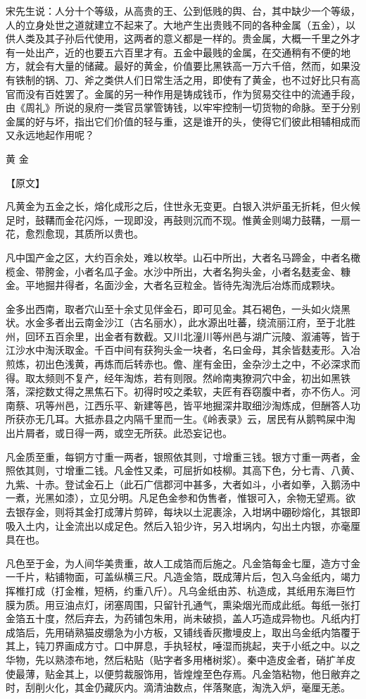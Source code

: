 \documentclass[12pt,UTF8]{ctexbook}
\begin{document}
宋先生说：人分十个等级，从高贵的王、公到低贱的舆、台，其中缺少一个等级，人的立身处世之道就建立不起来了。大地产生出贵贱不同的各种金属（五金），以供人类及其子孙后代使用，这两者的意义都是一样的。贵金属，大概一千里之外才有一处出产，近的也要五六百里才有。五金中最贱的金属，在交通稍有不便的地方，就会有大量的储藏。最好的黄金，价值要比黑铁高一万六千倍，然而，如果没有铁制的锅、刀、斧之类供人们日常生活之用，即使有了黄金，也不过好比只有高官而没有百姓罢了。金属的另一种作用是铸成钱币，作为贸易交往中的流通手段，由《周礼》所说的泉府一类官员掌管铸钱，以牢牢控制一切货物的命脉。至于分别金属的好与坏，指出它们价值的轻与重，这是谁开的头，使得它们彼此相辅相成而又永远地起作用呢？

黄 金

【原文】

凡黄金为五金之长，熔化成形之后，住世永无变更。白银入洪炉虽无折耗，但火候足时，鼓鞲而金花闪烁，一现即没，再鼓则沉而不现。惟黄金则竭力鼓鞲，一扇一花，愈烈愈现，其质所以贵也。

凡中国产金之区，大约百余处，难以枚举。山石中所出，大者名马蹄金，中者名橄榄金、带胯金，小者名瓜子金。水沙中所出，大者名狗头金，小者名麸麦金、糠金。平地掘井得者，名面沙金，大者名豆粒金。皆待先淘洗后冶炼而成颗块。

金多出西南，取者穴山至十余丈见伴金石，即可见金。其石褐色，一头如火烧黑状。水金多者出云南金沙江（古名丽水），此水源出吐蕃，绕流丽江府，至于北胜州，回环五百余里，出金者有数截。又川北潼川等州邑与湖广沅陵、溆浦等，皆于江沙水中淘沃取金。千百中间有获狗头金一块者，名曰金母，其余皆麸麦形。入冶煎炼，初出色浅黄，再炼而后转赤也。儋、崖有金田，金杂沙土之中，不必深求而得。取太频则不复产，经年淘炼，若有则限。然岭南夷獠洞穴中金，初出如黑铁落，深挖数丈得之黑焦石下。初得时咬之柔软，夫匠有吞窃腹中者，亦不伤人。河南蔡、巩等州邑，江西乐平、新建等邑，皆平地掘深井取细沙淘炼成，但酬答人功所获亦无几耳。大抵赤县之内隔千里而一生。《岭表录》云，居民有从鹅鸭屎中淘出片屑者，或日得一两，或空无所获。此恐妄记也。

凡金质至重，每铜方寸重一两者，银照依其则，寸增重三钱。银方寸重一两者，金照依其则，寸增重二钱。凡金性又柔，可屈折如枝柳。其高下色，分七青、八黄、九紫、十赤。登试金石上（此石广信郡河中甚多，大者如斗，小者如拳，入鹅汤中一煮，光黑如漆），立见分明。凡足色金参和伪售者，惟银可入，余物无望焉。欲去银存金，则将其金打成薄片剪碎，每块以土泥裹涂，入坩埚中硼砂熔化，其银即吸入土内，让金流出以成足色。然后入铅少许，另入坩埚内，勾出土内银，亦毫厘具在也。

凡色至于金，为人间华美贵重，故人工成箔而后施之。凡金箔每金七厘，造方寸金一千片，粘铺物面，可盖纵横三尺。凡造金箔，既成薄片后，包入乌金纸内，竭力挥椎打成（打金椎，短柄，约重八斤）。凡乌金纸由苏、杭造成，其纸用东海巨竹膜为质。用豆油点灯，闭塞周围，只留针孔通气，熏染烟光而成此纸。每纸一张打金箔五十度，然后弃去，为药铺包朱用，尚未破损，盖人巧造成异物也。凡纸内打成箔后，先用硝熟猫皮绷急为小方板，又铺线香灰撒墁皮上，取出乌金纸内箔覆于其上，钝刀界画成方寸。口中屏息，手执轻杖，唾湿而挑起，夹于小纸之中。以之华物，先以熟漆布地，然后粘贴（贴字者多用楮树浆）。秦中造皮金者，硝扩羊皮使最薄，贴金其上，以便剪裁服饰用，皆煌煌至色存焉。凡金箔粘物，他日敝弃之时，刮削火化，其金仍藏灰内。滴清油数点，伴落聚底，淘洗入炉，毫厘无恙。
\end{document}
